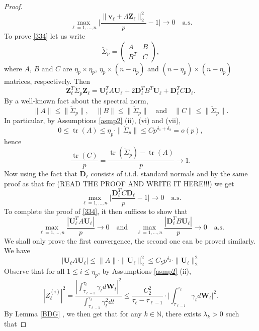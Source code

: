 \documentclass[a4paper,11pt]{article}
\theoremstyle{plain}
\theoremstyle{definition}
\newcommand{\MN}{\mathbb{N}}
\newcommand{\tr}{\operatorname{tr}}
\begin{document}
\begin{proof}
\begin{equation}
    		\max_{\ell = 1, \dots, n} \Bigg|\frac{  \| \mathbf{v}_\ell + \Lambda\mathbf{Z}_\ell  \|_2^2}{p} - 1\Bigg| \rightarrow 0 \quad \text{a.s.}
    	\end{equation}
    	To prove \eqref{334} let us write
    	\[ \breve{\Sigma}_p = \begin{pmatrix}
    	A & B \\
    	B^T & C
    	\end{pmatrix}, \]
    	where $A$, $B$ and $C$ are $\eta_p \times \eta_p$, $\eta_p \times (n - \eta_p)$ and $(n-\eta_p) \times (n-\eta_p)$ matrices, respectively. Then
    	\[ \mathbf{Z}_\ell^T \breve{\Sigma}_p \mathbf{Z}_\ell = \mathbf{U}_\ell^T A \mathbf{U}_\ell + 2\mathbf{D}_\ell^T B^T \mathbf{U}_\ell + \mathbf{D}_\ell^T C \mathbf{D}_\ell.  \]    	
    	By a well-known fact about the spectral norm,
    	\[ \|A\| \leq \|\breve{\Sigma}_p \|, \quad \|B\| \leq \|\breve{\Sigma}_p \| \quad \text{and} \quad \|C\| \leq \|\breve{\Sigma}_p \|. \]
    	In particular, by Assumptions \ref{asmp2} (ii), (vi) and (vii),
    	\[ 0 \leq \tr(A) \leq \eta_p \cdot \|\breve{\Sigma}_p \| \leq Cp^{\delta_1 + \delta_2} = o(p), \]
    	hence 
    	\[ \frac{\tr(C)}{p} = \frac{\tr(\breve{\Sigma}_p)-\tr(A)}{p} \rightarrow 1. \]
    	Now using the fact that $\mathbf{D}_\ell$ consists of i.i.d. standard normals and by the same proof as that for (READ THE PROOF AND WRITE IT HERE!!!)
    	we get
    	\[ \max_{\ell = 1, \dots, n} \Bigg| \frac{\mathbf{D}_\ell^T C \mathbf{D}_\ell}{p} - 1 \Bigg| \rightarrow 0 \quad \text{a.s.} \]
    	To complete the proof of \eqref{334}, it then suffices to show that
    	\[ \max_{\ell = 1, \dots, n} \frac{| \mathbf{U}_\ell^T A \mathbf{U}_\ell |}{p} \rightarrow 0 \quad \text{and} \quad \max_{\ell = 1, \dots, n} \frac{| \mathbf{D}_\ell^T B \mathbf{U}_\ell |}{p} \rightarrow 0 \quad \text{a.s.} \]
    	We shall only prove the first convergence, the second one can be proved similarly. We have
    	\begin{equation} \label{337}
    		|\mathbf{U}_\ell A \mathbf{U}_\ell| \leq \|A\| \cdot \|\mathbf{U}_\ell\|_2^2 \leq C_5 p^{\delta_2} \cdot \|\mathbf{U}_\ell\|_2^2
    	\end{equation}
    	Observe that for all $1 \leq i \leq \eta_p$, by Assumptions \ref{asmp2} (ii),
    	\[ | Z_\ell^{(i)} |^2 = \frac{|\int_{\tau_{\ell-1}}^{\tau_\ell} \gamma_t d\mathbf{W}_t|^2}{\int_{\tau_{\ell-1}}^{\tau_\ell} \gamma_t^2 dt} \leq \frac{C_2^2}{\tau_\ell-\tau_{\ell-1} } \cdot \Bigg|\int_{\tau_{\ell-1}}^{\tau_\ell} \gamma_t d\mathbf{W}_t \Bigg|^2. \] 
    	By Lemma \ref{BDG} , we then get that for any $k \in \MN$, there exists $\lambda_k > 0$ such that

\end{proof}
\end{document}
